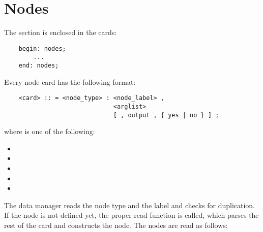 %
%
%
%
%
% 
%
%

\chapter{Nodes}\label{sec:NODES}
The  section is enclosed in the cards:
\begin{verbatim}
    begin: nodes;
        ...
    end: nodes;
\end{verbatim}
Every node card has the following format:
\begin{verbatim}
    <card> :: = <node_type> : <node_label> ,
                              <arglist>
                              [ , output , { yes | no } ] ;
\end{verbatim}
where  is one of the following:
\begin{itemize}
    \item {}
    \item {}
    \item {}
    \item {}
    \item {}
\end{itemize}
The data manager reads the node type and the label and checks for
duplication. If the node is not defined yet, the proper read function is
called, which parses the rest of the card and constructs the node.
The nodes are read as follows:




